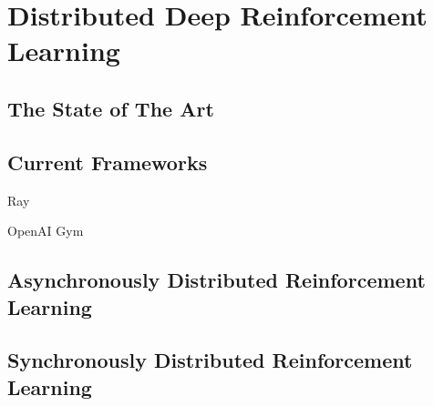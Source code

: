 
\chapter{Distributed Deep Reinforcement Learning}\label{chapter:Distributed Deep Reinforcement Learning}


\section{The State of The Art}

\section{Current Frameworks}

Ray ~\parencite{DBLP:journals/corr/abs-1712-05889}

OpenAI Gym ~\parencite{DBLP:journals/corr/BrockmanCPSSTZ16}

\section{Asynchronously Distributed Reinforcement Learning}

\section{Synchronously Distributed Reinforcement Learning}